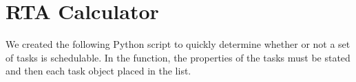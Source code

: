 
\chapter{RTA Calculator} %
We created the following Python script to quickly determine whether or not a set of tasks is schedulable. In the  function, the properties of the tasks must be stated and then each task object placed in the  list.
\label{cha:rta_calculator}

